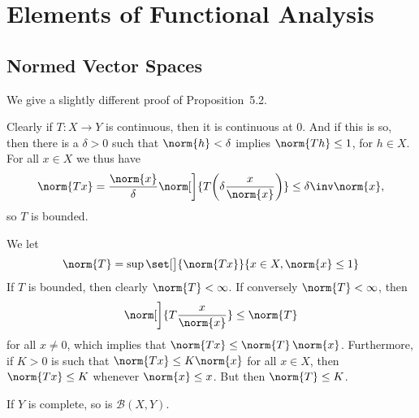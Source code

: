 \documentclass[article, a4paper, 11pt, oneside]{memoir}
\numberwithin{equation}{chapter}
\newcommand{\calB}{\mathcal{B}}
\theoremstyle{nonumberplain}
\begin{document}
\chapter{Elements of Functional Analysis}

\section{Normed Vector Spaces}

\begin{remark}
	We give a slightly different proof of Proposition~5.2.

	Clearly if $T \colon X \to Y$ is continuous, then it is continuous at $0$. And if this is so, then there is a $\delta > 0$ such that $\norm{h} < \delta$ implies $\norm{Th} \leq 1$, for $h \in X$. For all $x \in X$ we thus have
	\begin{equation*}
		\norm{Tx}
			= \frac{\norm{x}}{\delta} \norm[\bigg]{T \biggl( \delta \frac{x}{\norm{x}} \biggr) }
			\leq \delta\inv \norm{x},
	\end{equation*}
	so $T$ is bounded.

	We let
	\begin{equation*}
		\norm{T}
			= \sup \set[\big]{\norm{Tx}}{x \in X, \norm{x} \leq 1}
	\end{equation*}
	If $T$ is bounded, then clearly $\norm{T} < \infty$. If conversely $\norm{T} < \infty$, then
	\begin{equation*}
		\norm[\bigg]{T \frac{x}{\norm{x}} }
			\leq \norm{T}
	\end{equation*}
	for all $x \neq 0$, which implies that $\norm{Tx} \leq \norm{T} \, \norm{x}$. Furthermore, if $K > 0$ is such that $\norm{Tx} \leq K \norm{x}$ for all $x \in X$, then $\norm{Tx} \leq K$ whenever $\norm{x} \leq x$. But then $\norm{T} \leq K$.
\end{remark}


\begin{exerciseframed*}[3]
	If $Y$ is complete, so is $\calB(X,Y)$.
\end{exerciseframed*}
\end{document}
